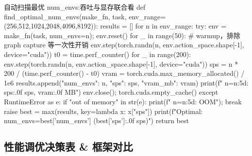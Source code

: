 \begin{codebox}[Python]{自动扫描最优 num\_envs:吞吐与显存联合看}
def find_optimal_num_envs(make_fn, task, env_range=(256,512,1024,2048,4096,8192)):
    results = []
    for n in env_range:
        try:
            env = make_fn(task, num_envs=n); env.reset()
            for _ in range(50):                          # warmup，排除 graph capture 等一次性开销
                env.step(torch.randn(n, env.action_space.shape[-1], device="cuda"))
            t0 = time.perf_counter()
            for _ in range(200):
                env.step(torch.randn(n, env.action_space.shape[-1], device="cuda"))
            sps  = n * 200 / (time.perf_counter() - t0)
            vram = torch.cuda.max_memory_allocated() / 1e6
            results.append({"num_envs": n, "sps": sps, "vram_mb": vram})
            print(f"  n={n:5d}: {sps:.0f} sps, {vram:.0f} MB")
            env.close(); torch.cuda.empty_cache()
        except RuntimeError as e:
            if "out of memory" in str(e): print(f"  n={n:5d}: OOM"); break
            raise
    best = max(results, key=lambda x: x["sps"])
    print(f"Optimal: num_envs={best['num_envs']} ({best['sps']:.0f} sps)")
    return best
\end{codebox}


\subsection{性能调优决策表 \& 框架对比}
\label{sec:rlmc-ls-perf-table}


